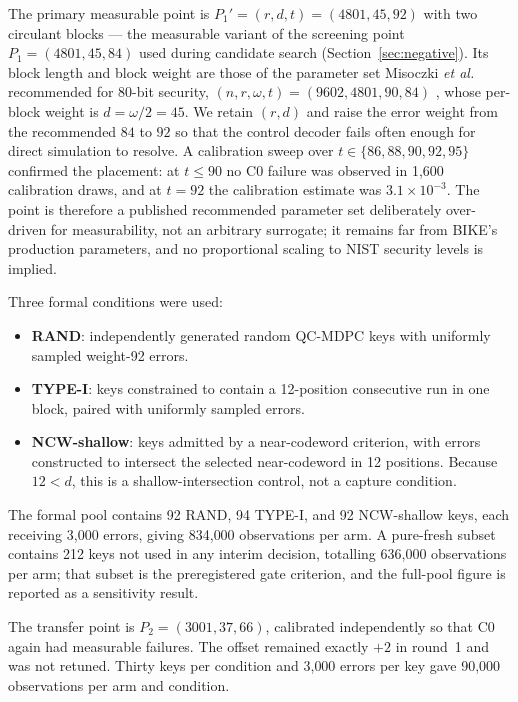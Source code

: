 \documentclass[lettersize,journal]{IEEEtran}
\begin{document}
The primary measurable point is $P_1'=(r,d,t)=(4801,45,92)$ with two circulant blocks --- the measurable variant of the screening point $P_1=(4801,45,84)$ used during candidate search (Section~\ref{sec:negative}). Its block length and block weight are those of the parameter set Misoczki \emph{et al.} recommended for 80-bit security, $(n,r,\omega,t)=(9602,4801,90,84)$ \cite{misoczki2013mdpc}, whose per-block weight is $d=\omega/2=45$. We retain $(r,d)$ and raise the error weight from the recommended $84$ to $92$ so that the control decoder fails often enough for direct simulation to resolve. A calibration sweep over $t\in\{86,88,90,92,95\}$ confirmed the placement: at $t\le90$ no C0 failure was observed in 1{,}600 calibration draws, and at $t=92$ the calibration estimate was $3.1\times10^{-3}$. The point is therefore a published recommended parameter set deliberately over-driven for measurability, not an arbitrary surrogate; it remains far from BIKE's production parameters, and no proportional scaling to NIST security levels is implied.

Three formal conditions were used:

\begin{itemize}[leftmargin=1.3em,itemsep=0.12em,topsep=0.2em]
\item \textbf{RAND}: independently generated random QC-MDPC keys with uniformly sampled weight-92 errors.
\item \textbf{TYPE-I}: keys constrained to contain a 12-position consecutive run in one block, paired with uniformly sampled errors.
\item \textbf{NCW-shallow}: keys admitted by a near-codeword criterion, with errors constructed to intersect the selected near-codeword in 12 positions. Because $12<d$, this is a shallow-intersection control, not a capture condition.
\end{itemize}

The formal pool contains 92 RAND, 94 TYPE-I, and 92 NCW-shallow keys, each receiving 3{,}000 errors, giving 834{,}000 observations per arm. A pure-fresh subset contains 212 keys not used in any interim decision, totalling 636{,}000 observations per arm; that subset is the preregistered gate criterion, and the full-pool figure is reported as a sensitivity result.

The transfer point is $P_2=(3001,37,66)$, calibrated independently so that C0 again had measurable failures. The offset remained exactly $+2$ in round~1 and was not retuned. Thirty keys per condition and 3{,}000 errors per key gave 90{,}000 observations per arm and condition.
\end{document}
